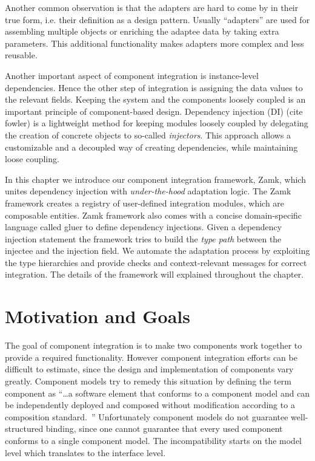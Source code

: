 Another common observation is that the adapters are hard to come by in their true form, i.e. their definition as a design pattern. Usually ``adapters'' are used for assembling multiple objects or enriching the adaptee data by taking extra parameters. This additional functionality makes adapters more complex and less reusable.  

Another important aspect of component integration is instance-level dependencies. 
Hence the other step of integration is assigning the data values to the relevant fields.  
Keeping the system and the components loosely coupled is an important principle of component-based design. 
Dependency injection (DI) (cite fowler) is a lightweight method for keeping modules loosely coupled by delegating the creation of concrete objects to so-called \emph{injectors}. This approach allows a customizable and a decoupled way of creating dependencies, while maintaining loose coupling.

In this chapter we introduce our component integration framework, Zamk, which unites dependency injection with \emph{under-the-hood} adaptation logic. The Zamk framework creates a registry of user-defined integration modules, which are composable entities. Zamk framework also comes with a concise domain-specific language called \textsf{gluer} to define dependency injections. Given a dependency injection statement the framework tries to build the \emph{type path} between the injectee and the injection field. We automate the adaptation process by exploiting the type hierarchies and provide checks and context-relevant messages for correct integration. The details of the framework will explained throughout the chapter.
 
\section{Motivation and Goals}

The goal of component integration is to make two components work together to provide a required functionality. However component integration efforts can be difficult to estimate, since the design and implementation of components vary greatly. Component models try to remedy this situation by defining the term component as ``\ldots a software element that conforms to a component model and can be independently deployed and composed without modification according to a composition standard.~\cite{Heineman2001}'' Unfortunately component models do not guarantee well-structured binding, since one cannot guarantee that every used component conforms to a single component model. The incompatibility starts on the model level which translates to the interface level. 

